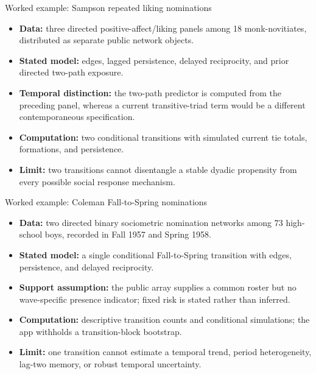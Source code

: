 \documentclass[aspectratio=169,11pt]{beamer}
\newcommand{\term}[1]{\textbf{\color{nupurple}#1}}
\begin{document}
\begin{frame}{Worked example: Sampson repeated liking nominations}
\begin{itemize}
\item \term{Data:} three directed positive-affect/liking panels among 18 monk-novitiates, distributed as separate public network objects.
\item \term{Stated model:} edges, lagged persistence, delayed reciprocity, and prior directed two-path exposure.
\item \term{Temporal distinction:} the two-path predictor is computed from the preceding panel, whereas a current transitive-triad term would be a different contemporaneous specification.
\item \term{Computation:} two conditional transitions with simulated current tie totals, formations, and persistence.
\item \term{Limit:} two transitions cannot disentangle a stable dyadic propensity from every possible social response mechanism.
\end{itemize}
\end{frame}

\begin{frame}{Worked example: Coleman Fall-to-Spring nominations}
\begin{itemize}
\item \term{Data:} two directed binary sociometric nomination networks among 73 high-school boys, recorded in Fall 1957 and Spring 1958.
\item \term{Stated model:} a single conditional Fall-to-Spring transition with edges, persistence, and delayed reciprocity.
\item \term{Support assumption:} the public array supplies a common roster but no wave-specific presence indicator; fixed risk is stated rather than inferred.
\item \term{Computation:} descriptive transition counts and conditional simulations; the app withholds a transition-block bootstrap.
\item \term{Limit:} one transition cannot estimate a temporal trend, period heterogeneity, lag-two memory, or robust temporal uncertainty.
\end{itemize}
\end{frame}
\end{document}
